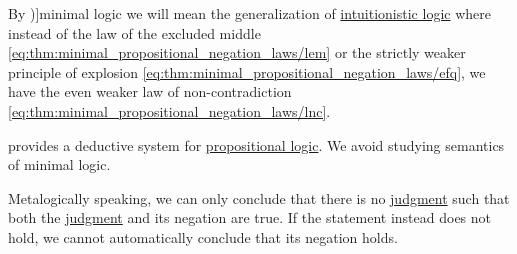 \begin{remark}\label{def:minimal_logic}
  By \term[en=minimal logic (\cite[8]{TroelstraSchwichtenberg2000})]{minimal logic} we will mean the generalization of \hyperref[def:intuitionistic_logic]{intuitionistic logic} where instead of the law of the excluded middle \eqref{eq:thm:minimal_propositional_negation_laws/lem} or the strictly weaker principle of explosion \eqref{eq:thm:minimal_propositional_negation_laws/efq}, we have the even weaker law of non-contradiction \eqref{eq:thm:minimal_propositional_negation_laws/lnc}.

   provides a deductive system for \hyperref[subsec:propositional_logic]{propositional logic}. We avoid studying semantics of minimal logic.
\end{remark}
\begin{comments}
  \item Metalogically speaking, we can only conclude that there is no \hyperref[def:judgment]{judgment} such that both the \hyperref[def:judgment]{judgment} and its negation are true. If the statement instead does not hold, we cannot automatically conclude that its negation holds.
\end{comments}


